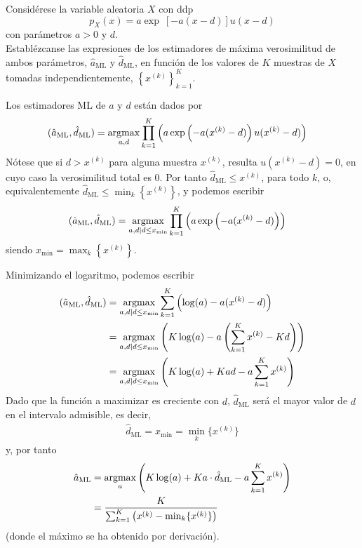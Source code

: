 \ifspanish

\question Considérese la variable aleatoria $X$ con ddp
$$p_X(x) = a\exp\ [-a(x-d) ]u(x-d)$$
con parámetros $a>0$ y $d$.\\
Establézcanse las expresiones de los estimadores de máxima verosimilitud de ambos parámetros, $\hat{a}_\text{ML}$ y $\hat{d}_\text{ML}$, en funci\'{o}n de los valores de $K$ muestras de $X$ tomadas independientemente, $\left\{x^{(k)}\right\}^{K}_{k=1}$.

\begin{solution}
Los estimadores ML de $a$ y $d$ están dados por
\begin{align*}
(\hat{a}_\text{ML}, \hat{d}_\text{ML}) 
	&= \operatorname*{argmax}_{a, d} \prod_{k=1}^{K} \left(a\exp\left(-a(x^{(k)}-d) \right)u(x^{(k)} - d)\right)
\end{align*}
Nótese que si $d > x^{(k)}$ para alguna muestra $x^{(k)}$, resulta $u(x^{(k)} - d)=0$, en cuyo caso la verosimilitud total es 0. Por tanto $\hat{d}_\text{ML} \le x^{(k)}$, para todo $k$, o, equivalentemente  $\hat{d}_\text{ML} \le \min_k \left\{x^{(k)}\right\}$, y podemos escribir
\begin{align*}
(\hat{a}_\text{ML}, \hat{d}_\text{ML}) 
	&= \operatorname*{argmax}_{a, d \mid d \le x_{\min} } 
	       \prod_{k=1}^{K} \left(a\exp\left(-a(x^{(k)}-d) \right)\right)
\end{align*}
siendo $x_{\min} = \max_k \left\{x^{(k)}\right\}$. 

Minimizando el logaritmo, podemos escribir
\begin{align*}
(\hat{a}_\text{ML}, \hat{d}_\text{ML}) 
	&= \operatorname*{argmax}_{a, d \mid d \le x_{\min}}
	       \sum_{k=1}^{K} \left(\log(a) -a (x^{(k)}-d) \right) \\
	&= \operatorname*{argmax}_{a, d \mid d \le x_{\min}} 
	       \left(K\log(a) -a \left(\sum_{k=1}^{K} x^{(k)}- Kd\right) \right) \\
	&= \operatorname*{argmax}_{a, d \mid d \le x_{\min}} 
	       \left(K\log(a) + Kad - a \sum_{k=1}^{K} x^{(k)} \right)
\end{align*}
Dado que  la función a maximizar es creciente con $d$, $\hat{d}_\text{ML}$ será el mayor valor de $d$ en el intervalo admisible, es decir,
\begin{align*}
\hat{d}_\text{ML} = x_{\min} = \min_{k}\{x^{(k)}\}
\end{align*}
y, por tanto
\begin{align*}
\hat{a}_\text{ML} 
	&= \operatorname*{argmax}_{a} \left(K\log(a) + Ka\cdot \hat{d}_\text{ML} - a \sum_{k=1}^{K} x^{(k)} \right) \\
	&= \frac{K}{\sum^{K}_{k=1} \left(x^{(k)}-\min_k\{x^{(k)}\} \right)}	
\end{align*}
(donde el máximo se ha obtenido por derivación).
\end{solution}

